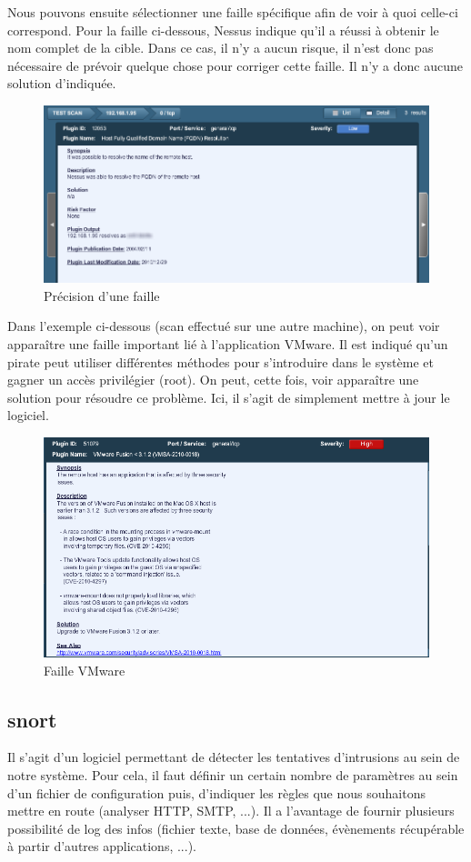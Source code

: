 \documentclass[a4paper,12pt]{article}
\begin{document}
Nous pouvons ensuite sélectionner une faille spécifique afin de voir à quoi celle-ci correspond. Pour la faille ci-dessous, Nessus indique qu'il a réussi 
à obtenir le nom complet de la cible. Dans ce cas, il n'y a aucun risque, il n'est donc pas nécessaire de prévoir quelque chose pour corriger cette faille. 
Il n'y a donc aucune solution d'indiquée.
\begin{figure}[H]
	\center
	\includegraphics[width=15cm]{img/nessus_scan_faille.png}
	\caption{Précision d'une faille}
\end{figure}

Dans l'exemple ci-dessous (scan effectué sur une autre machine), on peut voir apparaître une faille important lié à l'application VMware.
Il est indiqué qu'un pirate peut utiliser différentes méthodes pour s'introduire dans le système et gagner un accès privilégier (root). On peut, cette
fois, voir apparaître une solution pour résoudre ce problème. Ici, il s'agit de simplement mettre à jour le logiciel.
\begin{figure}[H]
	\center
	\includegraphics[width=15cm]{img/nessus_scan_vmware.png}
	\caption{Faille VMware}
\end{figure}


\subsection{snort}
Il s'agit d'un logiciel permettant de détecter les tentatives d'intrusions au sein de notre système. Pour cela, il faut définir un certain
nombre de paramètres au sein d'un fichier de configuration puis, d'indiquer les règles que nous souhaitons mettre en route (analyser HTTP, SMTP, ...).
Il a l'avantage de fournir plusieurs possibilité de log des infos (fichier texte, base de données, évènements récupérable à partir d'autres applications, ...).
\end{document}
